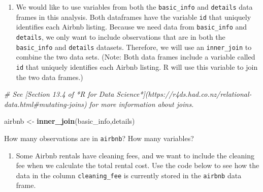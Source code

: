 \documentclass[]{book}
\newenvironment{Shaded}{\begin{snugshade}}{\end{snugshade}}
\newcommand{\KeywordTok}[1]{\textcolor[rgb]{0.13,0.29,0.53}{\textbf{#1}}}
\newcommand{\StringTok}[1]{\textcolor[rgb]{0.31,0.60,0.02}{#1}}
\newcommand{\CommentTok}[1]{\textcolor[rgb]{0.56,0.35,0.01}{\textit{#1}}}
\newcommand{\OperatorTok}[1]{\textcolor[rgb]{0.81,0.36,0.00}{\textbf{#1}}}
\newcommand{\NormalTok}[1]{#1}
\providecommand{\tightlist}{%
  \setlength{\itemsep}{0pt}\setlength{\parskip}{0pt}}
\begin{document}
\begin{enumerate}
\def\labelenumi{\arabic{enumi}.}
\tightlist
\item
  We would like to use variables from both the \texttt{basic\_info} and
  \texttt{details} data frames in this analysis. Both dataframes have
  the variable \texttt{id} that uniquely identifies each Airbnb listing.
  Because we need data from \texttt{basic\_info} and \texttt{details},
  we only want to include observations that are in both the
  \texttt{basic\_info} and \texttt{details} datasets. Therefore, we will
  use an \texttt{inner\_join} to combine the two data sets. (Note: Both
  data frames include a variable called \texttt{id} that uniquely
  identifies each Airbnb listing. R will use this variable to join the
  two data frames.)
\end{enumerate}

\begin{Shaded}
\begin{Highlighting}[]
\CommentTok{# See [Section 13.4 of *R for Data Science*](https://r4ds.had.co.nz/relational-data.html#mutating-joins) for more information about joins.}
\end{Highlighting}
\end{Shaded}

\begin{Shaded}
\begin{Highlighting}[]
\NormalTok{airbnb <-}\StringTok{ }\KeywordTok{inner_join}\NormalTok{(basic_info,details)}
\end{Highlighting}
\end{Shaded}

How many observations are in \texttt{airbnb}? How many variables?

\begin{enumerate}
\def\labelenumi{\arabic{enumi}.}
\setcounter{enumi}{1}
\tightlist
\item
  Some Airbnb rentals have cleaning fees, and we want to include the
  cleaning fee when we calculate the total rental cost. Use the code
  below to see how the data in the column \texttt{cleaning\_fee} is
  currently stored in the \texttt{airbnb} data frame.
\end{enumerate}

\begin{Shaded}
\end{Shaded}
\end{document}
